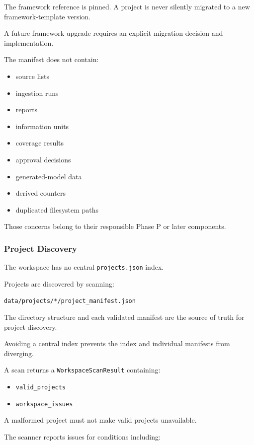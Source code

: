 The framework reference is pinned. A project is never silently migrated to a new framework-template version.

A future framework upgrade requires an explicit migration decision and implementation.

The manifest does not contain:

\begin{itemize}
\tightlist
\item
  source lists
\item
  ingestion runs
\item
  reports
\item
  information units
\item
  coverage results
\item
  approval decisions
\item
  generated-model data
\item
  derived counters
\item
  duplicated filesystem paths
\end{itemize}

Those concerns belong to their responsible Phase P or later components.

\hypertarget{project-discovery}{%
\subsubsection{Project Discovery}\label{project-discovery}}

The workspace has no central \texttt{projects.json} index.

Projects are discovered by scanning:

\texttt{data/projects/*/project\_manifest.json}

The directory structure and each validated manifest are the source of truth for project discovery.

Avoiding a central index prevents the index and individual manifests from diverging.

A scan returns a \texttt{WorkspaceScanResult} containing:

\begin{itemize}
\tightlist
\item
  \texttt{valid\_projects}
\item
  \texttt{workspace\_issues}
\end{itemize}

A malformed project must not make valid projects unavailable.

The scanner reports issues for conditions including:

